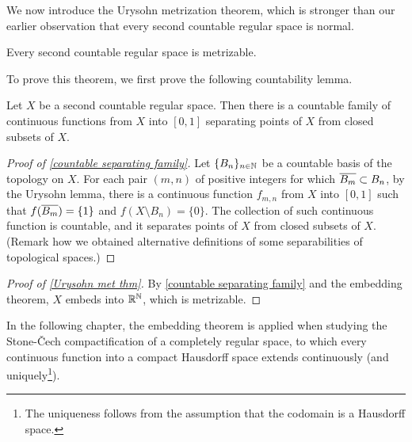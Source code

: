 We now introduce the Urysohn metrization theorem, which is stronger than our earlier observation that every second countable regular space is normal.
\begin{thm}\label{Urysohn met thm}
    Every second countable regular space is metrizable.
\end{thm}
To prove this theorem, we first prove the following countability lemma.
\begin{lem}\label{countable separating family}
    Let $X$ be a second countable regular space.
    Then there is a countable family of continuous functions from $X$ into $[0, 1]$ separating points of $X$ from closed subsets of $X$.
\end{lem}
\begin{proof}[Proof of \cref{countable separating family}]
    Let $\{B_n\}_{n\in{\mathbb{N}}}$ be a countable basis of the topology on $X$.
    For each pair $(m, n)$ of positive integers for which $\overline{B_m}\subset B_n$, by the Urysohn lemma, there is a continuous function $f_{m, n}$ from $X$ into $[0, 1]$ such that $f(\overline{B_m})=\{1\}$ and $f(X\setminus B_n)=\{0\}$.
    The collection of such continuous function is countable, and it separates points of $X$ from closed subsets of $X$. (Remark how we obtained alternative definitions of some separabilities of topological spaces.)
\end{proof}
\begin{proof}[Proof of \cref{Urysohn met thm}]
    By \cref{countable separating family} and the embedding theorem, $X$ embeds into ${\mathbb{R}}^{\mathbb{N}}$, which is metrizable.
\end{proof}

In the following chapter, the embedding theorem is applied when studying the Stone-\v{C}ech compactification of a completely regular space, to which every continuous function into a compact Hausdorff space extends continuously (and uniquely\footnote{The uniqueness follows from the assumption that the codomain is a Hausdorff space.}).
